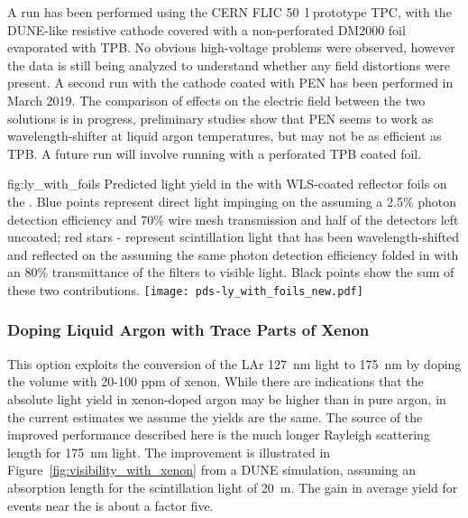 A run has been performed using the CERN FLIC \SI{50}{l} prototype TPC, with
the DUNE-like resistive cathode covered with a non-perforated DM2000
foil evaporated with TPB. No obvious high-voltage problems were observed, however
the data is still being analyzed to understand whether any field
distortions were present.  A second run with the cathode coated with PEN
has been performed in March 2019. The comparison of effects on the electric field between the two solutions is in progress, preliminary studies show that PEN seems to work as wavelength-shifter at liquid argon temperatures, but may not be as efficient as TPB. A future run will involve running with a perforated TPB coated foil.


\begin{dunefigure}{fig:ly_with_foils}
{Predicted light yield in the  with WLS-coated reflector foils on the . Blue points represent direct  light impinging on the  assuming a 2.5\% photon detection efficiency and 70\% wire mesh transmission and half of the detectors left uncoated; red stars - represent scintillation light that has been wavelength-shifted and reflected on the  assuming the same photon detection efficiency folded in with an 80\% transmittance of the filters to visible light. Black points show the sum of these two contributions.}
\texttt{[image: pds-ly\_with\_foils\_new.pdf]}
\end{dunefigure}

\subsubsection{Doping Liquid Argon with Trace Parts of Xenon}
\label{sec:fdsp-pd-enh-xenon}


This option exploits the conversion of the LAr \SI{127}{nm} light to \SI{175}{nm} by doping the \lar volume with 20-100 ppm of xenon.  While there are indications that the absolute light yield in xenon-doped argon may be higher than in pure argon, in the current estimates we assume the yields are the same. The source of the improved performance described here is the much longer Rayleigh scattering length for \SI{175}{nm} light.  The improvement is illustrated in Figure~\ref{fig:visibility_with_xenon} from a DUNE  simulation, assuming an absorption length for the scintillation light of \SI{20}{m}. The gain in average yield for events near the  is about a factor five.

